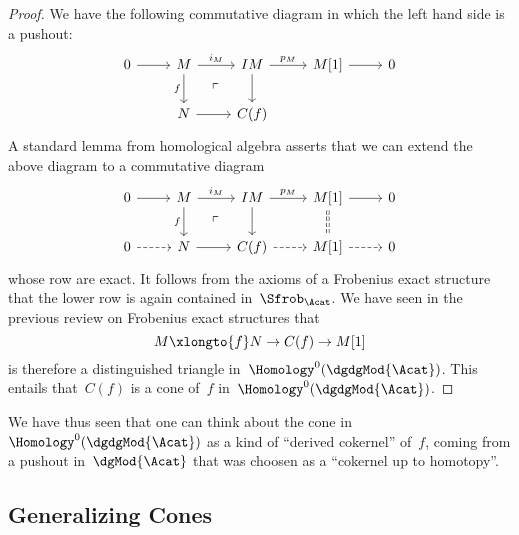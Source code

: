\documentclass[a4paper,10pt]{scrartcl}
\begin{document}
\begin{proof}
  We have the following commutative diagram in which the left hand side is a pushout:
  \[
    \begin{tikzcd}
      0
      \arrow{r}
      &
      M
      \arrow{r}[above]{i_M}
      \arrow{d}[left]{f}
      \arrow[phantom]{dr}{\ulcorner}
      &
      IM
      \arrow{r}[above]{p_M}
      \arrow{d}
      &
      M[1]
      \arrow{r}
      &
      0
      \\
      {}
      &
      N
      \arrow{r}
      &
      C(f)
      &
      {}
      &
      {}
    \end{tikzcd}
  \]
  A standard lemma from homological algebra asserts that we can extend the above diagram to a commutative diagram
  \[
    \begin{tikzcd}
      0
      \arrow{r}
      &
      M
      \arrow{r}[above]{i_M}
      \arrow{d}[left]{f}
      \arrow[phantom]{dr}{\ulcorner}
      &
      IM
      \arrow{r}[above]{p_M}
      \arrow{d}
      &
      M[1]
      \arrow{r}
      \arrow[dashed,equal]{d}
      &
      0
      \\
      0
      \arrow[dashed]{r}
      &
      N
      \arrow{r}
      &
      C(f)
      \arrow[dashed]{r}
      &
      M[1]
      \arrow[dashed]{r}
      &
      0
    \end{tikzcd}
  \]
  whose row are exact.
  It follows from the axioms of a Frobenius exact structure that the lower row is again contained in~$\Sfrob_{\Acat}$.
  We have seen in the previous review on Frobenius exact structures that
  \[
    M
    \xlongto{f}
    N
    \to
    C(f)
    \to
    M[1]
  \]
  is therefore a distinguished triangle in~$\Homology^0(\dgdgMod{\Acat})$.
  This entails that~$C(f)$ is a cone of~$f$ in~$\Homology^0(\dgdgMod{\Acat})$.
\end{proof}

We have thus seen that one can think about the cone in~$\Homology^0(\dgdgMod{\Acat})$ as a kind of \enquote{derived cokernel} of~$f$, coming from a pushout in~$\dgMod{\Acat}$ that was choosen as a \enquote{cokernel up to homotopy}.



\subsection{Generalizing Cones}
\end{document}
